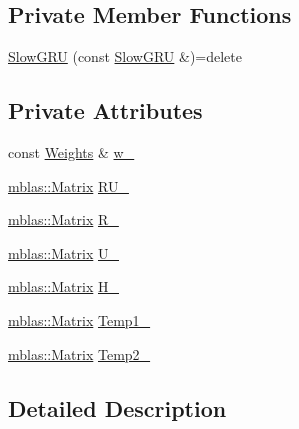 \subsection*{Private Member Functions}
\begin{DoxyCompactItemize}
\item 
\hyperlink{classamunmt_1_1GPU_1_1SlowGRU_a88bcf5dfa1b781cbe4df2faceb21d1d1}{Slow\+G\+RU} (const \hyperlink{classamunmt_1_1GPU_1_1SlowGRU}{Slow\+G\+RU} \&)=delete
\end{DoxyCompactItemize}
\subsection*{Private Attributes}
\begin{DoxyCompactItemize}
\item 
const \hyperlink{structamunmt_1_1GPU_1_1Weights}{Weights} \& \hyperlink{classamunmt_1_1GPU_1_1SlowGRU_a1391f44c8e8b746675cf8576401c8a71}{w\+\_\+}
\item 
\hyperlink{namespaceamunmt_1_1GPU_1_1mblas_ab67821a8254de53e45a623cf73c0aef6}{mblas\+::\+Matrix} \hyperlink{classamunmt_1_1GPU_1_1SlowGRU_a6d2c972c738d73a06832fc1c986c0661}{R\+U\+\_\+}
\item 
\hyperlink{namespaceamunmt_1_1GPU_1_1mblas_ab67821a8254de53e45a623cf73c0aef6}{mblas\+::\+Matrix} \hyperlink{classamunmt_1_1GPU_1_1SlowGRU_a6149bb77260336fc2fcb996efb869894}{R\+\_\+}
\item 
\hyperlink{namespaceamunmt_1_1GPU_1_1mblas_ab67821a8254de53e45a623cf73c0aef6}{mblas\+::\+Matrix} \hyperlink{classamunmt_1_1GPU_1_1SlowGRU_a1fe150f08247927994f75bd79f27a127}{U\+\_\+}
\item 
\hyperlink{namespaceamunmt_1_1GPU_1_1mblas_ab67821a8254de53e45a623cf73c0aef6}{mblas\+::\+Matrix} \hyperlink{classamunmt_1_1GPU_1_1SlowGRU_afbccdac0afde1ede4ff4f78e3c2421f7}{H\+\_\+}
\item 
\hyperlink{namespaceamunmt_1_1GPU_1_1mblas_ab67821a8254de53e45a623cf73c0aef6}{mblas\+::\+Matrix} \hyperlink{classamunmt_1_1GPU_1_1SlowGRU_a016b0350577ab601124fb3fa00454bd5}{Temp1\+\_\+}
\item 
\hyperlink{namespaceamunmt_1_1GPU_1_1mblas_ab67821a8254de53e45a623cf73c0aef6}{mblas\+::\+Matrix} \hyperlink{classamunmt_1_1GPU_1_1SlowGRU_a8db5f7a9fedce4e8ba545753e2e61c60}{Temp2\+\_\+}
\end{DoxyCompactItemize}


\subsection{Detailed Description}
